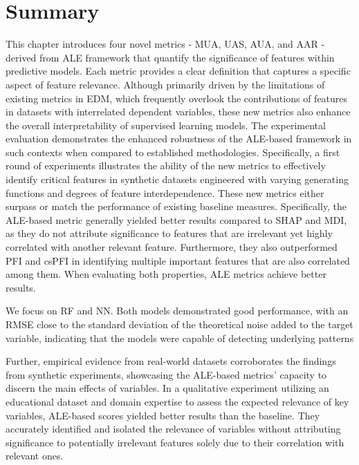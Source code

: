 \section{Summary}

This chapter introduces four novel metrics - \gls{MUA}, \gls{UAS}, \gls{AUA},  and \gls{AAR} - derived from \gls{ALE} framework that quantify the significance of features within predictive models. Each metric provides a clear definition that captures a specific aspect of feature relevance. Although primarily driven by the limitations of existing metrics in \gls{EDM}, which frequently overlook the contributions of features in datasets with interrelated dependent variables, these new metrics also enhance the overall interpretability of supervised learning models. The experimental evaluation demonstrates the enhanced robustness of the \gls{ALE}-based framework in such contexts when compared to established methodologies. Specifically, a first round of experiments illustrates the ability of the new metrics to effectively identify critical features in synthetic datasets engineered with varying generating functions and degrees of feature interdependence. These new metrics either surpass or match the performance of existing baseline measures. Specifically, the \gls{ALE}-based metric generally yielded better results compared to \gls{SHAP} and \gls{MDI}, as they do not attribute significance to features that are irrelevant yet highly correlated with another relevant feature. Furthermore, they also outperformed \gls{PFI} and \gls{csPFI} in identifying multiple important features that are also correlated among them. When evaluating both properties, \gls{ALE} metrics achieve better results.  

We focus on \gls{RF} and \gls{NN}. Both models demonstrated good performance, with an \gls{RMSE} close to the standard deviation of the theoretical noise added to the target variable, indicating that the models were capable of detecting underlying patterns

Further, empirical evidence from real-world datasets corroborates the findings from synthetic experiments, showcasing the \gls{ALE}-based metrics' capacity to discern the main effects of variables. In a qualitative experiment utilizing an educational dataset and domain expertise to assess the expected relevance of key variables, \gls{ALE}-based scores yielded better results than the baseline. They accurately identified and isolated the relevance of variables without attributing significance to potentially irrelevant features solely due to their correlation with relevant ones.

